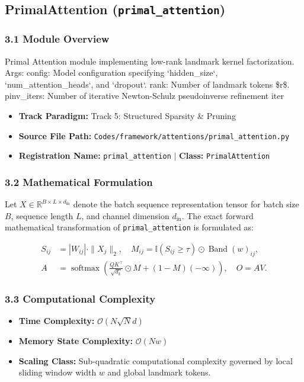 \subsection{PrimalAttention (\texttt{primal\_attention})}
\label{sec:app_module_primal_attention}

\subsubsection*{3.1 Module Overview}
Primal Attention module implementing low-rank landmark kernel factorization.  Args:     config: Model configuration specifying `hidden\_size`, `num\_attention\_heads`, and `dropout`.     rank: Number of landmark tokens \$r\$.     pinv\_iters: Number of iterative Newton-Schulz pseudoinverse refinement iter
\begin{itemize}
    \item \textbf{Track Paradigm:} Track 5: Structured Sparsity & Pruning
    \item \textbf{Source File Path:} \texttt{Codes/framework/attentions/primal\_attention.py}
    \item \textbf{Registration Name:} \texttt{primal\_attention} $\mid$ \textbf{Class:} \texttt{PrimalAttention}
\end{itemize}

\subsubsection*{3.2 Mathematical Formulation}
Let $X \in \mathbb{R}^{B \times L \times d_{\text{in}}}$ denote the batch sequence representation tensor for batch size $B$, sequence length $L$, and channel dimension $d_{\text{in}}$. The exact forward mathematical transformation of \texttt{primal\_attention} is formulated as:

\begin{align}
S_{ij} &= |W_{ij}| \cdot \|X_j\|_2, \quad M_{ij} = \mathbb{I}(S_{ij} \ge \tau) \odot \operatorname{Band}(w)_{ij}, \\
A &= \operatorname{softmax}\left(\frac{Q K^\top}{\sqrt{d_k}} \odot M + (1 - M)(-\infty)\right), \quad O = A V.
\end{align}


\subsubsection*{3.3 Computational Complexity}
\begin{itemize}
    \item \textbf{Time Complexity:} $\mathcal{O}(N \sqrt{N} d)$
    \item \textbf{Memory State Complexity:} $\mathcal{O}(N w)$
    \item \textbf{Scaling Class:} Sub-quadratic computational complexity governed by local sliding window width $w$ and global landmark tokens.
\end{itemize}

